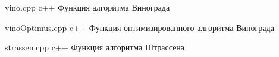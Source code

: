 \newpage
{}
	{vino.cpp} %
	{c++} %
	{Функция алгоритма Винограда} %
	
\newpage
{}
{vinoOptimus.cpp} %
{c++} %
{Функция оптимизированного алгоритма Винограда} %

\newpage
{}
{strassen.cpp} %
{c++} %
{Функция алгоритма Штрассена} %

